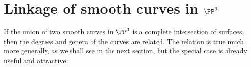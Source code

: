%
%
%
%
%

\section{Linkage of smooth curves in $\PP^3$}\label{SLinkage}\label{linkage section}

If the union of two smooth curves in $\PP^3$ is a complete intersection of surfaces, then the degrees and genera
of the curves are related. The relation is true much more generally, as we shall see in the next section, but the special
case is already useful and attractive:

